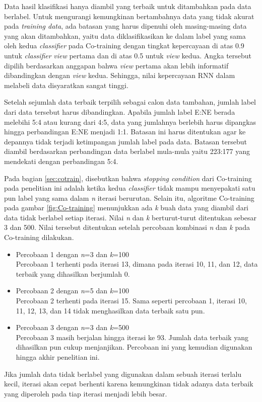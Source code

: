 Data hasil klasifikasi hanya diambil yang terbaik untuk ditambahkan pada data berlabel. Untuk mengurangi kemungkinan bertambahnya data yang tidak akurat pada \textit{training data}, ada batasan yang harus dipenuhi oleh masing-masing data yang akan ditambahkan, yaitu data diklasifikasikan ke dalam label yang sama oleh kedua \textit{classifier} pada Co-training dengan tingkat kepercayaan di atas 0.9 untuk \textit{classifier} \textit{view} pertama dan di atas 0.5 untuk \textit{view} kedua. Angka tersebut dipilih berdasarkan anggapan bahwa \textit{view} pertama akan lebih informatif dibandingkan dengan \textit{view} kedua. Sehingga, nilai kepercayaan RNN dalam melabeli data disyaratkan sangat tinggi.

Setelah sejumlah data terbaik terpilih sebagai calon data tambahan, jumlah label dari data tersebut harus dibandingkan. Apabila jumlah label E:NE berada melebihi 5:4 atau kurang dari 4:5, data yang jumlahnya berlebih harus dipangkas hingga perbandingan E:NE menjadi 1:1. Batasan ini harus ditentukan agar ke depannya tidak terjadi ketimpangan jumlah label pada data. Batasan tersebut diambil berdasarkan perbandingan data berlabel mula-mula yaitu 223:177 yang mendekati dengan perbandingan 5:4.

Pada bagian \ref{sec:cotrain}, disebutkan bahwa \textit{stopping condition} dari Co-training pada penelitian ini adalah ketika kedua \textit{classifier} tidak mampu menyepakati satu pun label yang sama dalam \textit{n} iterasi berurutan. Selain itu, algoritme Co-training pada gambar \ref{fig:Co-training} menunjukkan ada \textit{k} buah data yang diambil dari data tidak berlabel setiap iterasi. Nilai \textit{n} dan \textit{k} berturut-turut ditentukan sebesar 3 dan 500. Nilai tersebut ditentukan setelah percobaan kombinasi \textit{n} dan \textit{k} pada Co-training dilakukan.
\begin{itemize}
	\item Percobaan 1 dengan \textit{n}=3 dan \textit{k}=100\\ Percobaan 1 terhenti pada iterasi 13, dimana pada iterasi 10, 11, dan 12, data terbaik yang dihasilkan berjumlah 0. 
	\item Percobaan 2 dengan \textit{n}=5 dan \textit{k}=100\\ Percobaan 2 terhenti pada iterasi 15. Sama seperti percobaan 1, iterasi 10, 11, 12, 13, dan 14 tidak menghasilkan data terbaik satu pun. 
	\item Percobaan 3 dengan \textit{n}=3 dan \textit{k}=500\\ Percobaan 3 masih berjalan hingga iterasi ke 93. Jumlah data terbaik yang dihasilkan pun cukup menjanjikan. Percobaan ini yang kemudian digunakan hingga akhir penelitian ini.
\end{itemize}
Jika jumlah data tidak berlabel yang digunakan dalam sebuah iterasi terlalu kecil, iterasi akan cepat berhenti karena kemungkinan tidak adanya data terbaik yang diperoleh pada tiap iterasi menjadi lebih besar.

